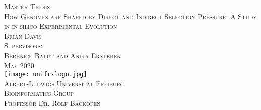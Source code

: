 \begin{titlepage}
\begin{center}
	\vspace{6em}
	{\huge \textsc{Master Thesis}}\\
	\vspace{3em}
	{\huge \textsc{How Genomes are Shaped by Direct and Indirect Selection Pressure: A Study in in silico Experimental Evolution}}\\
	\vspace{3em}
	{\Large \textsc{Brian Davis}}\\
	\vspace{2em}
	{\large \textsc{Supervisors:}}\\
	\vspace{1em}
	{\large \textsc{B\'{e}r\'{e}nice Batut and Anika Erxleben}}\\
	\vspace{3em}
	{\Large \textsc{May 2020}}\\
	\vspace{5em}
	\texttt{[image: unifr-logo.jpg]}\\
	\vspace{3em}
	{\Large \textsc{Albert-Ludwigs Universität Freiburg}}\\
	\vspace{1em}
	{\Large \textsc{Bioinformatics Group}}\\
	\vspace{1em}
	{\Large \textsc{Professor Dr. Rolf Backofen}}\\
\end{center}
\end{titlepage}
